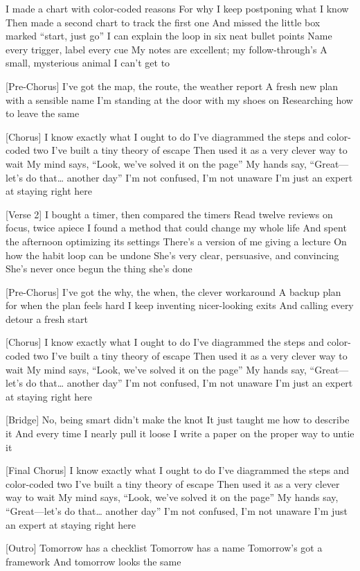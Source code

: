 \begin{lyrics}
[Verse 1]
I made a chart with color-coded reasons
For why I keep postponing what I know
Then made a second chart to track the first one
And missed the little box marked “start, just go”
I can explain the loop in six neat bullet points
Name every trigger, label every cue
My notes are excellent; my follow-through’s
A small, mysterious animal I can’t get to

[Pre-Chorus]
I’ve got the map, the route, the weather report
A fresh new plan with a sensible name
I’m standing at the door with my shoes on
Researching how to leave the same

[Chorus]
I know exactly what I ought to do
I’ve diagrammed the steps and color-coded two
I’ve built a tiny theory of escape
Then used it as a very clever way to wait
My mind says, “Look, we’ve solved it on the page”
My hands say, “Great—let’s do that… another day”
I’m not confused, I’m not unaware
I’m just an expert at staying right here

[Verse 2]
I bought a timer, then compared the timers
Read twelve reviews on focus, twice apiece
I found a method that could change my whole life
And spent the afternoon optimizing its settings
There’s a version of me giving a lecture
On how the habit loop can be undone
She’s very clear, persuasive, and convincing
She’s never once begun the thing she’s done

[Pre-Chorus]
I’ve got the why, the when, the clever workaround
A backup plan for when the plan feels hard
I keep inventing nicer-looking exits
And calling every detour a fresh start

[Chorus]
I know exactly what I ought to do
I’ve diagrammed the steps and color-coded two
I’ve built a tiny theory of escape
Then used it as a very clever way to wait
My mind says, “Look, we’ve solved it on the page”
My hands say, “Great—let’s do that… another day”
I’m not confused, I’m not unaware
I’m just an expert at staying right here

[Bridge]
No, being smart didn’t make the knot
It just taught me how to describe it
And every time I nearly pull it loose
I write a paper on the proper way to untie it

[Final Chorus]
I know exactly what I ought to do
I’ve diagrammed the steps and color-coded two
I’ve built a tiny theory of escape
Then used it as a very clever way to wait
My mind says, “Look, we’ve solved it on the page”
My hands say, “Great—let’s do that… another day”
I’m not confused, I’m not unaware
I’m just an expert at staying right here

[Outro]
Tomorrow has a checklist
Tomorrow has a name
Tomorrow’s got a framework
And tomorrow looks the same
\end{lyrics}

